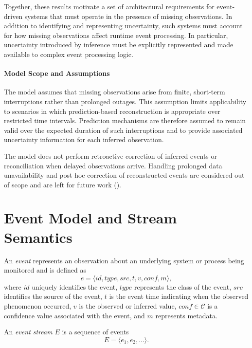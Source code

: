 Together, these results motivate a set of architectural requirements for event-driven systems that must operate in the presence of missing observations. In addition to identifying and representing uncertainty, such systems must account for how missing observations affect runtime event processing. In particular, uncertainty introduced by inference must be explicitly represented and made available to complex event processing logic.

\paragraph{Model Scope and Assumptions}
The model assumes that missing observations arise from finite, short-term interruptions rather than prolonged outages. This assumption limits applicability to scenarios in which prediction-based reconstruction is appropriate over restricted time intervals. Prediction mechanisms are therefore assumed to remain valid over the expected duration of such interruptions and to provide associated uncertainty information for each inferred observation.

The model does not perform retroactive correction of inferred events or reconciliation when delayed observations arrive. Handling prolonged data unavailability and post hoc correction of reconstructed events are considered out of scope and are left for future work ().




\section{Event Model and Stream Semantics}
\label{sec:events-streams}

An \emph{event} represents an observation about an underlying system or process being monitored and is defined as
\begin{equation}
e = \langle id, type, src, t, v, conf, m \rangle ,
\end{equation}
\noindent
where $id$ uniquely identifies the event, $type$ represents the class of the event, $src$ identifies the source of the event, $t$ is the event time indicating when the observed phenomenon occurred, $v$ is the observed or inferred value, $conf \in \mathcal{C}$ is a confidence value associated with the event, and $m$ represents metadata.

An \emph{event stream} $E$ is a sequence of events
\begin{equation}
E = \langle e_1, e_2, \dots \rangle .
\end{equation}

